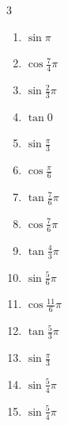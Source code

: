 \begin{multicols}{3}
\begin{enumerate}
  \item $\displaystyle \sin{\pi}$
        \phantom{$\displaystyle =0$}

  \item $\displaystyle \cos{\frac{7}{4}\pi}$

  \item $\displaystyle \sin{\frac{2}{3}\pi}$

  \item $\displaystyle \tan{0}$
        \phantom{$\displaystyle =0$}

  \item $\displaystyle \sin{\frac{\pi}{3}}$

  \item $\displaystyle \cos{\frac{\pi}{6}}$

  \item $\displaystyle \tan{\frac{7}{6}\pi}$

  \item $\displaystyle \cos{\frac{7}{6}\pi}$

  \item $\displaystyle \tan{\frac{4}{3}\pi}$

  \item $\displaystyle \sin{\frac{5}{6}\pi}$

  \item $\displaystyle \cos{\frac{11}{6}\pi}$

  \item $\displaystyle \tan{\frac{5}{3}\pi}$

  \item $\displaystyle \sin{\frac{\pi}{3}}$

  \item $\displaystyle \sin{\frac{5}{4}\pi}$

\columnbreak %

\resetques

  \item $\displaystyle \sin{\frac{5}{4}\pi}$


\end{enumerate}
\end{multicols}
